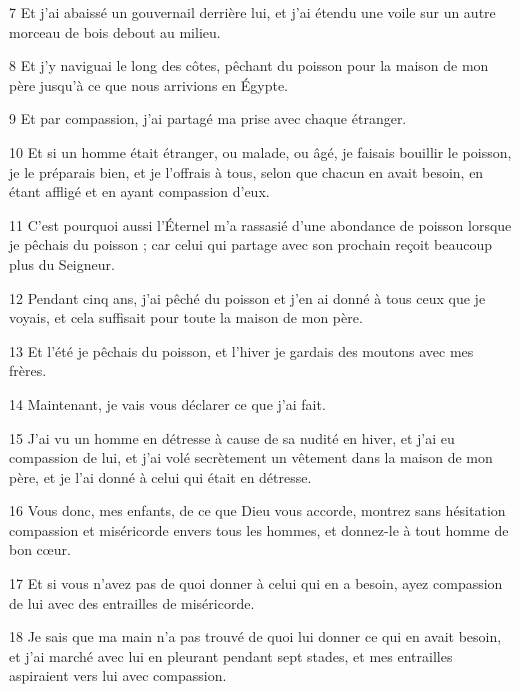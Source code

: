 \par 7 Et j'ai abaissé un gouvernail derrière lui, et j'ai étendu une voile sur un autre morceau de bois debout au milieu.

\par 8 Et j'y naviguai le long des côtes, pêchant du poisson pour la maison de mon père jusqu'à ce que nous arrivions en Égypte.

\par 9 Et par compassion, j'ai partagé ma prise avec chaque étranger.

\par 10 Et si un homme était étranger, ou malade, ou âgé, je faisais bouillir le poisson, je le préparais bien, et je l'offrais à tous, selon que chacun en avait besoin, en étant affligé et en ayant compassion d'eux.

\par 11 C'est pourquoi aussi l'Éternel m'a rassasié d'une abondance de poisson lorsque je pêchais du poisson ; car celui qui partage avec son prochain reçoit beaucoup plus du Seigneur.

\par 12 Pendant cinq ans, j'ai pêché du poisson et j'en ai donné à tous ceux que je voyais, et cela suffisait pour toute la maison de mon père.

\par 13 Et l'été je pêchais du poisson, et l'hiver je gardais des moutons avec mes frères.

\par 14 Maintenant, je vais vous déclarer ce que j'ai fait.

\par 15 J'ai vu un homme en détresse à cause de sa nudité en hiver, et j'ai eu compassion de lui, et j'ai volé secrètement un vêtement dans la maison de mon père, et je l'ai donné à celui qui était en détresse.

\par 16 Vous donc, mes enfants, de ce que Dieu vous accorde, montrez sans hésitation compassion et miséricorde envers tous les hommes, et donnez-le à tout homme de bon cœur.

\par 17 Et si vous n'avez pas de quoi donner à celui qui en a besoin, ayez compassion de lui avec des entrailles de miséricorde.

\par 18 Je sais que ma main n'a pas trouvé de quoi lui donner ce qui en avait besoin, et j'ai marché avec lui en pleurant pendant sept stades, et mes entrailles aspiraient vers lui avec compassion.

